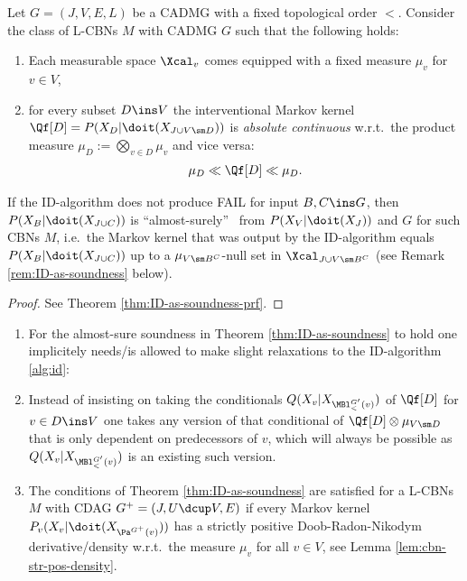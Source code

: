 \begin{Thm}
    \label{thm:ID-as-soundness}
    Let $G=(J,V,E,L)$ be a CADMG with a fixed topological order $<$. 
    Consider the class of L-CBNs $M$ with \observational CADMG $G$ such that the following holds: 
    \begin{enumerate}
        \item Each measurable space $\Xcal_v$ comes equipped with a fixed measure $\mu_v$ for $v \in V$,
        \item for every subset $D \ins V$ the interventional Markov kernel $\Qf[D]=P(X_D|\doit(X_{J \cup V \sm D}))$ is
            \emph{absolute continuous} w.r.t.\ the product measure $\mu_D:=\bigotimes_{v \in D} \mu_v$ and vice versa:
            \[ \mu_D \ll \Qf[D] \ll \mu_D.   \]
    \end{enumerate}
    If the ID-algorithm does not produce FAIL for input $B, C \ins G$,
    then $P(X_B|\doit(X_{J \cup C}))$ is ``almost-surely'' \trackable\ from $P(X_V|\doit(X_J))$ and $G$ for such CBNs $M$, 
    i.e.\ the Markov kernel that was output by the ID-algorithm equals $P(X_B|\doit(X_{J \cup C}))$ up to a
    $\mu_{V\sm B^C}$-null set in $\Xcal_{J \cup V\sm B^C}$ (see Remark \ref{rem:ID-as-soundness} below).
    \begin{proof}
        See Theorem \ref{thm:ID-as-soundness-prf}.
    \end{proof}
\end{Thm}

\begin{Rem}
    \label{rem:ID-as-soundness}
    \begin{enumerate}
        \item For the almost-sure soundness in Theorem \ref{thm:ID-as-soundness} to hold one implicitely needs/is allowed
            to make slight relaxations to the ID-algorithm \ref{alg:id}: 
        \item[] Instead of insisting on taking the conditionals $Q(X_v|X_{\MBl^{G'}_<(v)})$ 
            of $\Qf[D]$ for $v \in D \ins V$ one takes any version of that conditional of $\Qf[D]\otimes \mu_{V \sm D}$ 
            that is only dependent on predecessors of $v$, 
            which will always be possible as $Q(X_v|X_{\MBl^{G'}_<(v)})$ is an existing such version.
        \item The conditions of Theorem \ref{thm:ID-as-soundness} are satisfied for a L-CBNs $M$ with CDAG
            $G^+=(J, U \dcup V,E)$ if every Markov kernel $P_v(X_v|\doit(X_{\Pa^{G^+}(v)}))$ has a strictly positive Doob-Radon-Nikodym derivative/density w.r.t.\ the measure $\mu_v$ for all $v \in V$, see Lemma \ref{lem:cbn-str-pos-density}.
    \end{enumerate}
\end{Rem}

